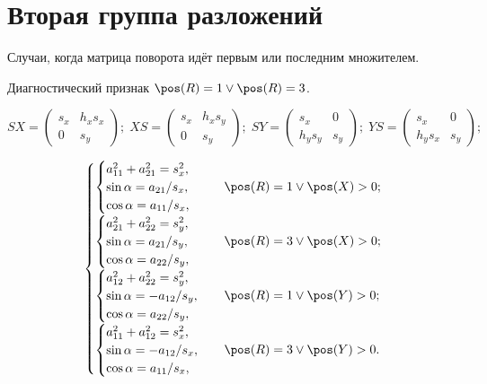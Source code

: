 \section{Вторая группа разложений}

Случаи, когда матрица поворота идёт первым или последним множителем.

Диагностический признак $\pos(R)=1 \vee \pos(R)=3 $.

$$
SX = \begin{pmatrix}s_x & h_xs_x \\ 0 & s_y\end{pmatrix};\;
XS = \begin{pmatrix}s_x & h_xs_y \\ 0 & s_y\end{pmatrix};\;
SY = \begin{pmatrix}s_x & 0 \\ h_ys_y & s_y\end{pmatrix};\;
YS = \begin{pmatrix}s_x & 0 \\ h_ys_x & s_y\end{pmatrix};
$$

$$
\begin{cases}
	\begin{cases}
		a_{11}^2 + a_{21}^2 = s_x^2, \\
		\sin\alpha = a_{21}/s_x,\\
		\cos\alpha = a_{11}/s_x,
	\end{cases} & \pos(R)=1 \vee \pos(X)>0;\\
	\begin{cases}
		a_{21}^2 + a_{22}^2 = s_y^2, \\
		\sin\alpha = a_{21}/s_y,\\
		\cos\alpha = a_{22}/s_y,
	\end{cases} & \pos(R)=3 \vee \pos(X)>0;\\
	\begin{cases}
		a_{12}^2 + a_{22}^2 = s_y^2,\\
		\sin\alpha = -a_{12}/s_y,\\
		\cos\alpha = a_{22}/s_y,
	\end{cases} & \pos(R)=1 \vee \pos(Y)>0;\\
	\begin{cases}
		a_{11}^2 + a_{12}^2 = s_x^2,\\
		\sin\alpha = -a_{12}/s_x,\\
		\cos\alpha = a_{11}/s_x,
	\end{cases} & \pos(R)=3 \vee \pos(Y)>0.\\
\end{cases}
$$

